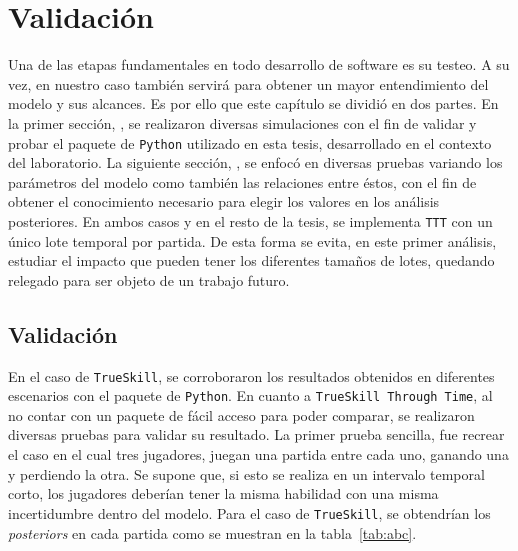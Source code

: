 \documentclass[11pt,twoside,spanish]{report} %
\begin{document}





\chapter{Validaci\'on}

Una de las etapas fundamentales en todo desarrollo de software es su testeo.
A su vez, en nuestro caso tambi\'en servir\'a para obtener un mayor entendimiento del modelo y sus alcances.
Es por ello que este cap\'itulo se dividi\'o en dos partes.
En la primer secci\'on, , se realizaron diversas simulaciones con el fin de validar y probar el paquete de \texttt{Python} utilizado en esta tesis, desarrollado en el contexto del laboratorio.
La siguiente secci\'on, , se enfoc\'o en diversas pruebas variando los par\'ametros del modelo como tambi\'en las relaciones entre \'estos, con el fin de obtener el conocimiento necesario para elegir los valores en los an\'alisis posteriores.
En ambos casos y en el resto de la tesis, se implementa \texttt{TTT} con un \'unico lote temporal por partida.
De esta forma se evita, en este primer an\'alisis, estudiar el impacto que pueden tener los diferentes tama\~nos de lotes, quedando relegado para ser objeto de un trabajo futuro.

\section{Validaci\'on}\label{sec:validacion}


En el caso de \texttt{TrueSkill}, se corroboraron los resultados obtenidos en diferentes escenarios con el paquete de \texttt{Python}.
En cuanto a \texttt{TrueSkill Through Time}, al no contar con un paquete de f\'acil acceso para poder comparar, se realizaron diversas pruebas para validar su resultado.
La primer prueba sencilla, fue recrear el caso en el cual tres jugadores, juegan una partida entre cada uno, ganando una y perdiendo la otra.
Se supone que, si esto se realiza en un intervalo temporal corto, los jugadores deber\'ian tener la misma habilidad con una misma incertidumbre dentro del modelo.
Para el caso de \texttt{TrueSkill}, se obtendr\'ian los \textit{posteriors} en cada partida como se muestran en la tabla~\ref{tab:abc}.
\end{document}
